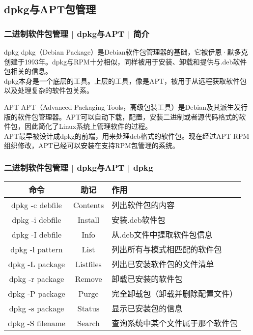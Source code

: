 \subsection{dpkg与APT包管理}
\begin{frame}
  \frametitle{二进制软件包管理 | dpkg与APT | 简介}
  \begin{block}{dpkg}
  dpkg（Debian Package）是Debian软件包管理器的基础，它被伊恩·默多克创建于1993年。dpkg与RPM十分相似，同样被用于安装、卸载和提供与.deb软件包相关的信息。\\ 

  dpkg本身是一个底层的工具。上层的工具，像是APT，被用于从远程获取软件包以及处理复杂的软件包关系。
  \end{block}
  \pause
  \begin{block}{APT}
  APT（Advanced Packaging Tools，高级包装工具）是Debian及其派生发行版的软件包管理器。APT可以自动下载，配置，安装二进制或者源代码格式的软件包，因此简化了Linux系统上管理软件的过程。\\
  APT最早被设计成dpkg的前端，用来处理deb格式的软件包。现在经过APT-RPM组织修改，APT已经可以安装在支持RPM包管理的系统。
  \end{block}
\end{frame}

\begin{frame}
  \frametitle{二进制软件包管理 | dpkg与APT | \alert{dpkg}}
  \begin{table}
    \centering
    \begin{tabularx}{\textwidth}{ccX}
      \hline
      \rowcolor{blue!50}命令 & 助记 & 作用\\
      \hline
      dpkg -c debfile & Contents & 列出软件包的内容\\
      dpkg -i debfile & Install & 安装.deb软件包\\
      dpkg -I debfile & Info & 从.deb文件中提取软件包信息\\
      dpkg -l pattern & List & 列出所有与模式相匹配的软件包\\
      dpkg -L package & Listfiles & 列出已安装软件包的文件清单\\
      dpkg -r package & Remove & 卸载已安装的软件包\\
      dpkg -P package & Purge & 完全卸载包（卸载并删除配置文件）\\
      dpkg -s package & Status & 显示已安装包的信息\\
      dpkg -S filename & Search & 查询系统中某个文件属于那个软件包\\
      \hline
    \end{tabularx}
  \end{table}
\end{frame}

